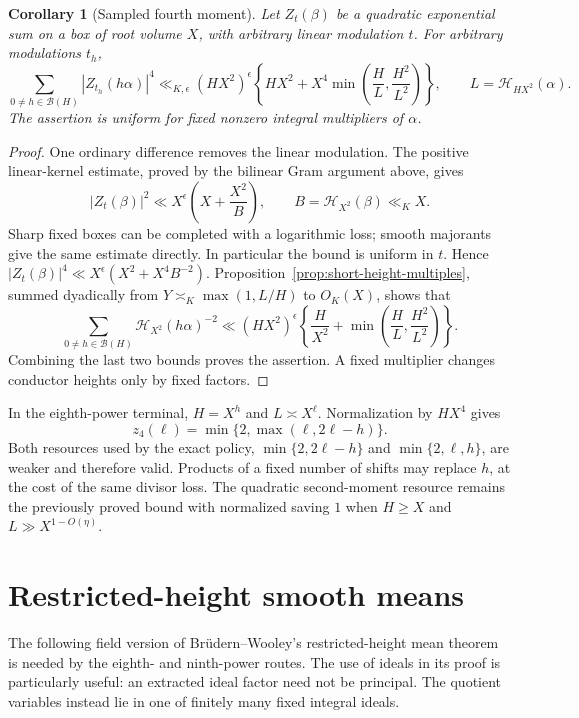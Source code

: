 \documentclass[11pt]{amsart}
\newtheorem{corollary}[theorem]{Corollary}
\theoremstyle{definition}
\numberwithin{equation}{section}
\begin{document}
\begin{corollary}[Sampled fourth moment]
\label{cor:quadratic-fourth-field}
Let $Z_t(\beta)$ be a quadratic exponential sum on a box of root volume
$X$, with arbitrary linear modulation $t$. For arbitrary modulations $t_h$,
\[
 \sum_{0\ne h\in\mathcal B(H)}|Z_{t_h}(h\alpha)|^4
 \ll_{K,\epsilon}(HX^2)^\epsilon
 \left\{HX^2+X^4\min\left(\frac HL,\frac{H^2}{L^2}\right)\right\},
 \qquad L=\mathcal H_{HX^2}(\alpha).
\]
The assertion is uniform for fixed nonzero integral multipliers of $\alpha$.
\end{corollary}
\begin{proof}
One ordinary difference removes the linear modulation. The positive
linear-kernel estimate, proved by the bilinear Gram argument above, gives
\[
 |Z_t(\beta)|^2\ll X^\epsilon
       \left(X+\frac{X^2}{B}\right),\qquad
 B=\mathcal H_{X^2}(\beta)\ll_K X.
\]
Sharp fixed boxes can be completed with a logarithmic loss; smooth majorants
give the same estimate directly. In particular the bound is uniform in $t$.
Hence $|Z_t(\beta)|^4\ll X^\epsilon(X^2+X^4B^{-2})$.
Proposition~\ref{prop:short-height-multiples}, summed dyadically from
$Y\asymp_K\max(1,L/H)$ to $O_K(X)$, shows that
\[
 \sum_{0\ne h\in\mathcal B(H)}\mathcal H_{X^2}(h\alpha)^{-2}
 \ll (HX^2)^\epsilon
       \left\{\frac H{X^2}
        +\min\left(\frac HL,\frac{H^2}{L^2}\right)\right\}.
\]
Combining the last two bounds proves the assertion. A fixed multiplier
changes conductor heights only by fixed factors.
\end{proof}

In the eighth-power terminal, $H=X^h$ and $L\asymp X^\ell$.
Normalization by $HX^4$ gives
\[
 z_4(\ell)=\min\{2,\max(\ell,2\ell-h)\}.
\]
Both resources used by the exact policy,
$\min\{2,2\ell-h\}$ and $\min\{2,\ell,h\}$, are weaker and therefore valid.
Products of a fixed number of shifts may replace $h$, at the cost of the
same divisor loss. The quadratic second-moment resource remains the
previously proved bound with normalized saving $1$ when $H\ge X$ and
$L\gg X^{1-O(\eta)}$.

\section{Restricted-height smooth means}
\label{sec:restricted-field}

The following field version of Br\"udern--Wooley's restricted-height
mean theorem is needed by the eighth- and ninth-power routes.  The use of
ideals in its proof is particularly useful: an extracted ideal factor
need not be principal.  The quotient variables instead lie in one of
finitely many fixed integral ideals.
\end{document}
